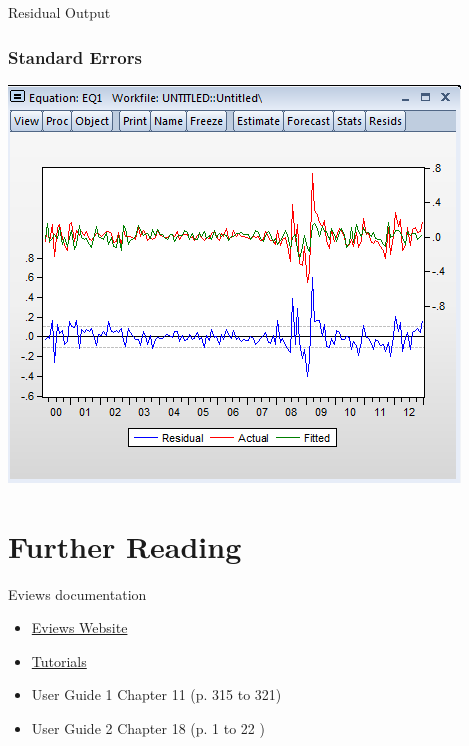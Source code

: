 \documentclass[14pt,xcolor=pdftex,dvipsnames,table]{beamer}\usepackage[]{graphicx}\usepackage[]{color}
\begin{document}
\begin{frame}{Residual Output}
\graphicspath{{./Figures/}}
\frametitle{Standard Errors}
\begin{center}
\includegraphics[height = 3 in]{resid}
\end{center}
\end{frame}


\section{Further Reading}
\begin{frame}{Eviews documentation}
\begin{itemize}[<+-| alert@+>]
\item \href{http://www.eviews.com/home.html}{Eviews Website}
\item \href{http://www.eviews.com/Learning/index.html}{Tutorials}
\item User Guide 1 Chapter 11 (p. 315 to 321)
\item User Guide 2 Chapter 18 (p. 1 to 22 )
\end{itemize}
\end{frame}

%
\end{document}
